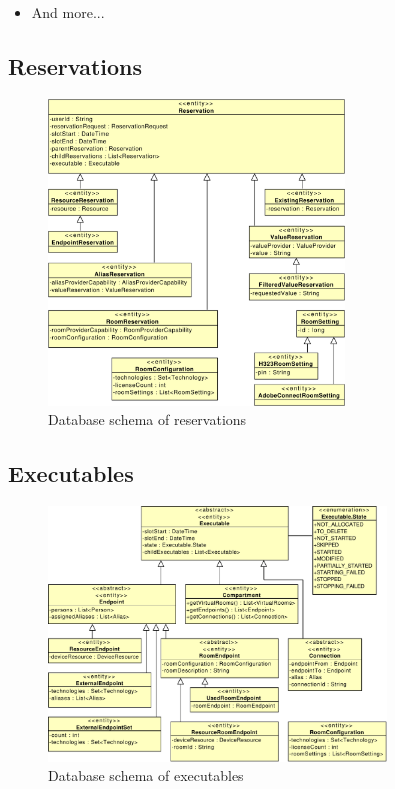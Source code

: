 \begin{itemize}
\item And more...

\end{itemize}



\cleardoublepage
\subsection{Reservations}

\begin{figure}[ht!]
\centering\includegraphics[width=0.7\textwidth]{diagrams/cd_reservations}
\caption{Database schema of reservations}
\label{fig:reservations}
\end{figure}



\cleardoublepage
\subsection{Executables}

\begin{figure}[ht!]
\centering\includegraphics[width=0.8\textwidth]{diagrams/cd_executables}
\caption{Database schema of executables}
\label{fig:executables}
\end{figure}




